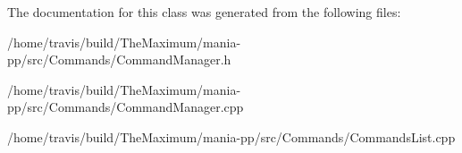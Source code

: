 The documentation for this class was generated from the following files\-:\begin{DoxyCompactItemize}
\item 
/home/travis/build/\-The\-Maximum/mania-\/pp/src/\-Commands/Command\-Manager.\-h\item 
/home/travis/build/\-The\-Maximum/mania-\/pp/src/\-Commands/Command\-Manager.\-cpp\item 
/home/travis/build/\-The\-Maximum/mania-\/pp/src/\-Commands/Commands\-List.\-cpp\end{DoxyCompactItemize}
